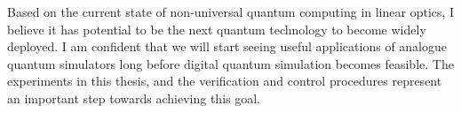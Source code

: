 Based on the current state of non-universal quantum computing in linear optics,
I believe it has potential to be the next quantum technology to become widely
deployed. I am confident that we will start seeing useful applications of
analogue quantum simulators long before digital quantum simulation becomes
feasible. The experiments in this thesis, and the verification and control
procedures represent an important step towards achieving this goal.
